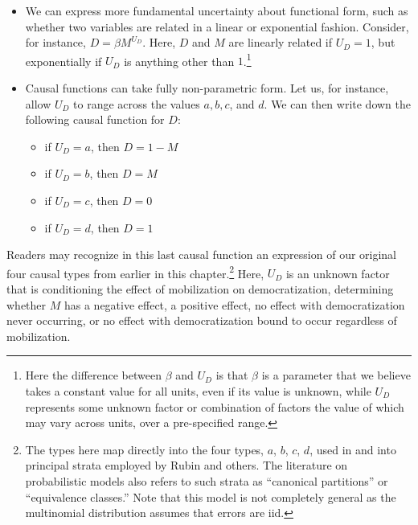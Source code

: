 \documentclass[12pt,]{book}
\providecommand{\tightlist}{%
  \setlength{\itemsep}{0pt}\setlength{\parskip}{0pt}}
\let\rmarkdownfootnote\footnote%
\def\footnote{\protect\rmarkdownfootnote}
\begin{document}
\begin{itemize}
\item
  We can express more fundamental uncertainty about functional form, such as whether two variables are related in a linear or exponential fashion. Consider, for instance, \(D=\beta M^{U_D}\). Here, \(D\) and \(M\) are linearly related if \(U_D=1\), but exponentially if \(U_D\) is anything other than \(1\).\footnote{Here the difference between \(\beta\) and \(U_D\) is that \(\beta\) is a parameter that we believe takes a constant value for all units, even if its value is unknown, while \(U_D\) represents some unknown factor or combination of factors the value of which may vary across units, over a pre-specified range.}
\item
  Causal functions can take fully non-parametric form. Let us, for instance, allow \(U_D\) to range across the values \(a, b, c\), and \(d\). We can then write down the following causal function for \(D\):

  \begin{itemize}
  \tightlist
  \item
    if \(U_D=a\), then \(D=1-M\)
  \item
    if \(U_D=b\), then \(D=M\)
  \item
    if \(U_D=c\), then \(D=0\)
  \item
    if \(U_D=d\), then \(D=1\)
  \end{itemize}
\end{itemize}

Readers may recognize in this last causal function an expression of our original four causal types from earlier in this chapter.\footnote{The types here map directly into the four types, \(a\), \(b\), \(c\), \(d\), used in \citet{humphreys2015mixing} and into principal strata employed by Rubin and others. The literature on probabilistic models also refers to such strata as ``canonical partitions'' or ``equivalence classes.'' Note that this model is not completely general as the multinomial distribution assumes that errors are iid.} Here, \(U_D\) is an unknown factor that is conditioning the effect of mobilization on democratization, determining whether \(M\) has a negative effect, a positive effect, no effect with democratization never occurring, or no effect with democratization bound to occur regardless of mobilization.
\end{document}
